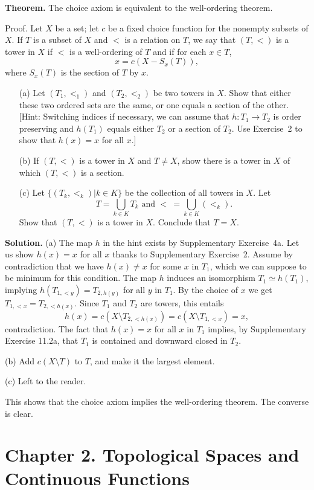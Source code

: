 \documentclass[12pt,letterpaper]{article}
\newcommand{\noi}{\noindent}%
\newcommand{\sm}{\setminus}
\begin{document}
\noi\textbf{Theorem.} The choice axiom is equivalent to the well-ordering theorem.

\noi Proof. Let $X$ be a set; let $c$ be a fixed choice function for the nonempty subsets of $X$. If $T$ is a subset of $X$ and $<$ is a relation on $T$, we say that $(T, <)$ is a tower in $X$ if $<$ is a well-ordering of $T$ and if for each $x \in T$,
\[x = c(X - S_x(T)),\]
where $S_x(T)$ is the section of $T$ by $x$.
\begin{enumerate}
    \item[(a)] Let $(T_1, <_1)$ and $(T_2, <_2)$ be two towers in $X$. Show that either these two ordered sets are the same, or one equals a section of the other. [Hint: Switching indices if necessary, we can assume that $h: T_1 \to T_2$ is order preserving and $h(T_1)$ equals either $T_2$ or a section of $T_2$. Use Exercise~2 to show that $h(x) = x$ for all $x$.]
    \item[(b)] If $(T, <)$ is a tower in $X$ and $T \neq X$, show there is a tower in $X$ of which $(T, <)$ is a section.
    \item[(c)] Let $\{(T_k, <_k)|k \in K\}$ be the collection of all towers in $X$. Let
    \[T = \bigcup_{k\in K} T_k \text{ and } <\ = \bigcup_{k\in K} (<_k).\]
    Show that $(T, <)$ is a tower in $X$. Conclude that $T = X$.
\end{enumerate} 

\noi\textbf{Solution.} (a) The map $h$ in the hint exists by Supplementary Exercise~4a. Let us show $h(x)=x$ for all $x$ thanks to Supplementary Exercise~2. Assume by contradiction that we have $h(x)\ne x$ for some $x$ in $T_1$, which we can suppose to be minimum for this condition. The map $h$ induces an isomorphism $T_1\simeq h(T_1)$, implying $h(T_{1,<y})=T_{2,h(y)}$ for all $y$ in $T_1$. By the choice of $x$ we get $T_{1,<x}=T_{2,<h(x)}$. Since $T_1$ and $T_2$ are towers, this entails 
$$
h(x)=c(X\sm T_{2,<h(x)})=c(X\sm T_{1,<x})=x,
$$ 
contradiction. The fact that $h(x)=x$ for all $x$ in $T_1$ implies, by Supplementary Exercise 11.2a, that $T_1$ is contained and downward closed in $T_2$. 

\noi(b) Add $c(X\sm T)$ to $T$, and make it the largest element. 

\noi(c) Left to the reader. 

This shows that the choice axiom implies the well-ordering theorem. The converse is clear. 

\section{Chapter 2. Topological Spaces and Continuous Functions}
\end{document}
